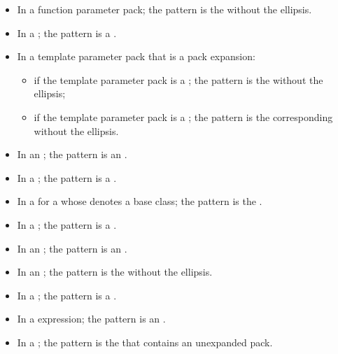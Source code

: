 \begin{itemize}
\item In a function parameter pack; the pattern is the
 without the ellipsis.

\item In a ;
the pattern is a .

\item In a template parameter pack that is a pack expansion:

\begin{itemize}
\item
if the template parameter pack is a ;
the pattern is the  without the ellipsis;

\item
if the template parameter pack is a ;
the pattern is the corresponding 
without the ellipsis.
\end{itemize}

\item In an ;
the pattern is an .

\item In a ;
the pattern is a .

\item In a  for a
 whose  denotes a
base class; the pattern is the .

\item In a ;
the pattern is a .

\item In an ; the pattern is
an .

\item In an ; the pattern is
the  without the ellipsis.

\item In a ; the pattern is
a .

\item In a  expression; the pattern is an
.

\item In a ;
the pattern is the 
that contains an unexpanded pack.
\end{itemize}

